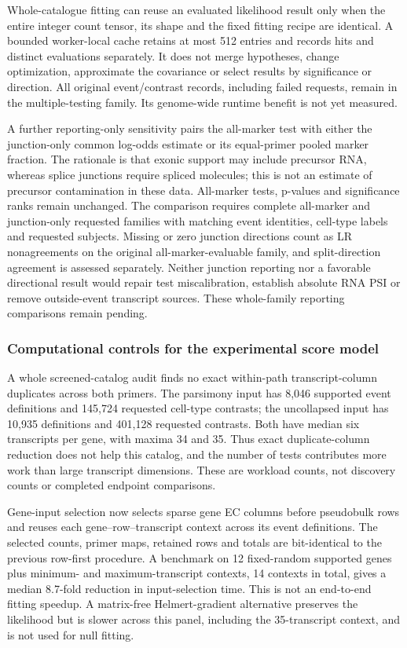 \documentclass[11pt]{article}
\begin{document}
Whole-catalogue fitting can reuse an evaluated likelihood result only when the entire integer count tensor, its shape and the fixed fitting recipe are identical. A bounded worker-local cache retains at most 512 entries and records hits and distinct evaluations separately. It does not merge hypotheses, change optimization, approximate the covariance or select results by significance or direction. All original event/contrast records, including failed requests, remain in the multiple-testing family. Its genome-wide runtime benefit is not yet measured.

A further reporting-only sensitivity pairs the all-marker test with either the junction-only common log-odds estimate or its equal-primer pooled marker fraction. The rationale is that exonic support may include precursor RNA, whereas splice junctions require spliced molecules; this is not an estimate of precursor contamination in these data. All-marker tests, p-values and significance ranks remain unchanged. The comparison requires complete all-marker and junction-only requested families with matching event identities, cell-type labels and requested subjects. Missing or zero junction directions count as LR nonagreements on the original all-marker-evaluable family, and split-direction agreement is assessed separately. Neither junction reporting nor a favorable directional result would repair test miscalibration, establish absolute RNA PSI or remove outside-event transcript sources. These whole-family reporting comparisons remain pending.

\subsubsection*{Computational controls for the experimental score model}

A whole screened-catalog audit finds no exact within-path transcript-column duplicates across both primers. The parsimony input has 8,046 supported event definitions and 145,724 requested cell-type contrasts; the uncollapsed input has 10,935 definitions and 401,128 requested contrasts. Both have median six transcripts per gene, with maxima 34 and 35. Thus exact duplicate-column reduction does not help this catalog, and the number of tests contributes more work than large transcript dimensions. These are workload counts, not discovery counts or completed endpoint comparisons.

Gene-input selection now selects sparse gene EC columns before pseudobulk rows and reuses each gene--row--transcript context across its event definitions. The selected counts, primer maps, retained rows and totals are bit-identical to the previous row-first procedure. A benchmark on 12 fixed-random supported genes plus minimum- and maximum-transcript contexts, 14 contexts in total, gives a median 8.7-fold reduction in input-selection time. This is not an end-to-end fitting speedup. A matrix-free Helmert-gradient alternative preserves the likelihood but is slower across this panel, including the 35-transcript context, and is not used for null fitting.
\end{document}
